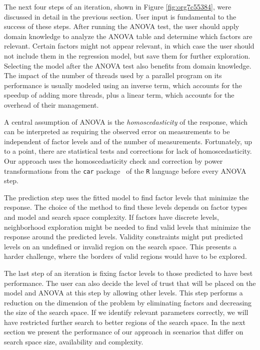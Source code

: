 \documentclass[conference]{IEEEtran}
\begin{document}
The next four steps of an iteration, shown in Figure \ref{fig:org7c55384},
were discussed in detail in the previous section. User input is fundamental to
the success of these steps. After running the ANOVA test, the user should apply
domain knowledge to analyze the ANOVA table and determine which factors are
relevant. Certain factors might not appear relevant, in which case the user
should not include them in the regression model, but save them for further
exploration. Selecting the model after the ANOVA test also benefits from domain
knowledge. The impact of the number of threads used by a parallel program on its
performance is usually modeled using an inverse term, which accounts for the
speedup of adding more threads, plus a linear term, which accounts for the
overhead of their management.

A central assumption of ANOVA is the \emph{homoscedasticity} of the response, which
can be interpreted as requiring the observed error on measurements to be
independent of factor levels and of the number of measurements. Fortunately, up
to a point, there are statistical tests and corrections for lack of
homoscedasticity. Our approach uses the homoscedasticity check and correction by
power transformations from the \texttt{car} package~\cite{fox2011car} of the \texttt{R}
language before every ANOVA step.

The prediction step uses the fitted model to find factor levels that minimize
the response. The choice of the method to find these levels depends on factor
types and model and search space complexity. If factors have discrete levels,
neighborhood exploration might be needed to find valid levels that minimize the
response around the predicted levels. Validity constraints might put predicted
levels on an undefined or invalid region on the search space. This presents a
harder challenge, where the borders of valid regions would have to be explored.

The last step of an iteration is fixing factor levels to those predicted to have
best performance. The user can also decide the level of trust that will be
placed on the model and ANOVA at this step by allowing other levels. This step
performs a reduction on the dimension of the problem by eliminating factors and
decreasing the size of the search space. If we identify relevant parameters
correctly, we will have restricted further search to better regions of the
search space. In the next section we present the performance of our approach in
scenarios that differ on search space size, availability and complexity.
\end{document}
